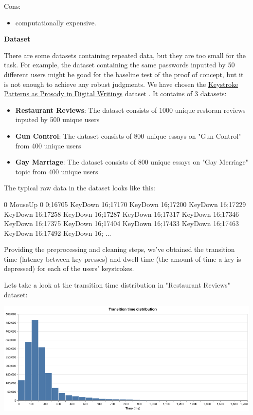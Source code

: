 \documentclass[12pt,a4]{article}
\begin{document}
Cons:
\begin{itemize}
    \item computationally expensive. 
\end{itemize}



\bigskip
\large\textbf{Dataset}
\bigskip

\normalsize
There are some datasets containing repeated data, but they are too small for the task. For example, the dataset containing the same passwords inputted by 50 different users might be good for the baseline test of the proof of concept, but it is not enough to achieve any robust judgments.
We have chosen the  \href{http://www3.cs.stonybrook.edu/~rbanerjee/project-pages/keystrokes/keystrokes.html}{Keystroke Patterns as Prosody in Digital Writings} dataset \cite{banerjee2014_emnlp}. It contains of 3 datasets: \begin{itemize}
	\item \textbf{Restaurant Reviews}: The dataset consists of 1000 unique restoran reviews inputed by 500 unique users
	\item \textbf{Gun Control}: The dataset consists of 800 unique essays on "Gun Control" from 400 unique users
	\item \textbf{Gay Marriage}: The dataset consists of 800 unique essays on "Gay Merriage" topic  from 400 unique users
\end{itemize}

The typical raw data in the dataset looks like this:
\bigskip

\begin{text}
	0 MouseUp 0 0;16705 KeyDown 16;17170 KeyDown 16;17200 KeyDown 16;17229 KeyDown 16;17258 KeyDown 16;17287 KeyDown 16;17317 KeyDown 16;17346 KeyDown 16;17375 KeyDown 16;17404 KeyDown 16;17433 KeyDown 16;17463 KeyDown 16;17492 KeyDown 16; ...
\end{text}

Providing the preprocessing and cleaning steps, we've obtained the transition time (latency between key presses) and dwell time (the amount of time a key is depressed) for each of the users' keystrokes.

Lets take a look at the transition time distribution in "Restaurant Reviews" dataset:
\begin{center}
\centering
\includegraphics[width=0.85\linewidth]{images/transitions_time.png}
\end{center}
\end{document}
